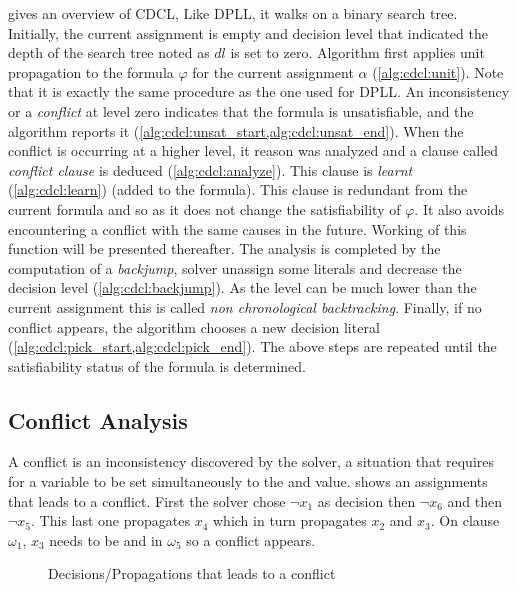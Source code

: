  gives an overview of CDCL, Like DPLL,  it walks on a binary search tree.
Initially, the current assignment is empty and decision level that indicated the depth of the search tree noted as $dl$ is set to zero.
Algorithm first applies unit propagation to the formula $\varphi$ for the current assignment $\alpha$ (\cref{alg:cdcl:unit}).
Note that it is exactly the same procedure as the one used for DPLL.
An inconsistency or a \emph{conflict} at level zero indicates that the formula is unsatisfiable, and the algorithm
reports it (\cref{alg:cdcl:unsat_start,alg:cdcl:unsat_end}). When the conflict is occurring at a higher level, it
reason was analyzed and a clause called \emph{conflict clause} is deduced (\cref{alg:cdcl:analyze}).
This clause is \emph{learnt} (\cref{alg:cdcl:learn}) (added to the formula). This clause is redundant from the current
formula and so as it does not change the satisfiability of $\varphi$. It also avoids encountering a conflict with the same
causes in the future. Working of this function will be presented thereafter.
The analysis is completed by the computation of a \emph{backjump}, solver unassign some literals and decrease
the decision level (\cref{alg:cdcl:backjump}). As the level can be much lower than the current assignment this is called 
\emph{non chronological backtracking}.
Finally, if no conflict appears, the algorithm chooses a new decision literal 
(\cref{alg:cdcl:pick_start,alg:cdcl:pick_end}).
The above steps are repeated until the satisfiability status of the
formula is determined.



\subsection{Conflict Analysis}
A conflict is an inconsistency discovered by the solver, a situation that requires for a variable to be set 
simultaneously to the \true and \false value.  shows an assignments that leads to a conflict.
First the solver chose $\neg x_1$ as decision then $\neg x_6$ and then $\neg x_5$. This last one propagates $x_4$
which in turn propagates $x_2$ and $x_3$. On clause $\omega_1$, $x_3$ needs to be \true and \false in $\omega_5$ so
a conflict appears.

\begin{figure}[!htbp]
	\centering
		
	\caption{Decisions/Propagations that leads to a  conflict}
	\label{fig:conflict}
\end{figure}

